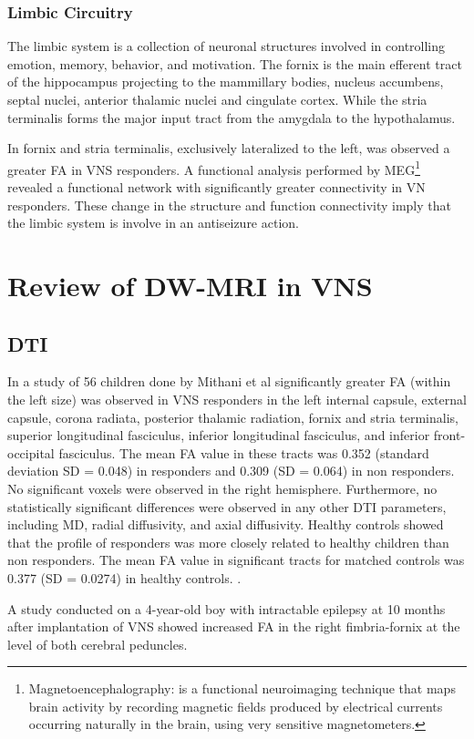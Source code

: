 
    \subsubsection*{Limbic Circuitry}
    The limbic system is a collection of neuronal structures involved in controlling emotion, memory, behavior, and motivation. The fornix is the main efferent tract of the hippocampus projecting to the mammillary bodies, nucleus accumbens, septal nuclei, anterior thalamic nuclei and cingulate cortex. While the stria terminalis forms the major input tract from the amygdala to the hypothalamus. 

    In fornix and stria terminalis, exclusively lateralized to the left, was observed a greater FA in VNS responders.
    A functional analysis performed by MEG\footnote{Magnetoencephalography: is a functional neuroimaging technique that maps brain activity by recording magnetic fields produced by electrical currents occurring naturally in the brain, using very sensitive magnetometers.} revealed a functional network with significantly greater connectivity in VN responders.
    These change in the structure and function connectivity imply that the limbic system is involve in an antiseizure action. \cite{Mithani2019, Mithani2020}


\section{Review of DW-MRI in VNS}
  \subsection*{DTI}
  In a study of 56 children done by Mithani et al significantly greater FA (within the left size) was observed in VNS responders in the left internal capsule, external capsule, corona radiata, posterior thalamic radiation, fornix and stria terminalis, superior longitudinal fasciculus, inferior longitudinal fasciculus, and inferior front-occipital fasciculus. The mean FA value in these tracts was 0.352 (standard deviation SD = 0.048) in responders and 0.309 (SD = 0.064) in non responders. No significant voxels were observed in the right hemisphere. Furthermore, no statistically significant differences were observed in any other DTI parameters, including MD, radial diffusivity, and axial diffusivity. Healthy controls showed that the profile of responders was more closely related to healthy children than non responders. The mean FA value in significant tracts for matched controls was 0.377 (SD = 0.0274) in healthy controls. \cite{Mithani2019}.

  A study conducted on a 4-year-old boy with intractable epilepsy at 10 months after implantation of VNS showed increased FA in the right fimbria-fornix at the level of both cerebral peduncles. \cite{Fan2014}

